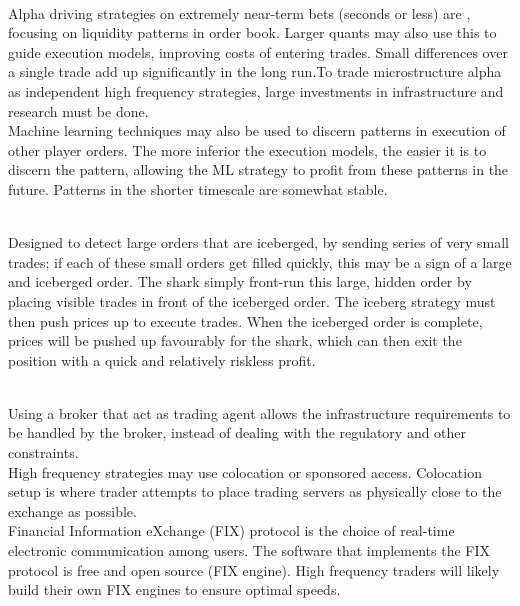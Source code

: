 \documentclass[a4paper,oneside,openany]{book}
\begin{document}
\begin{definition} \\
Alpha driving strategies on extremely near-term bets (seconds or less) are , focusing on liquidity patterns in order book. Larger quants may also use this to guide execution models, improving costs of entering trades. Small differences over a single trade add up significantly in the long run.To trade microstructure alpha as independent high frequency strategies, large investments in infrastructure and research must be done.\\
Machine learning techniques may also be used to discern patterns in execution of other player orders. The more inferior the execution models, the easier it is to discern the pattern, allowing the ML strategy to profit from these patterns in the future. Patterns in the shorter timescale are somewhat stable.
\end{definition}

\begin{definition} \\
Designed to detect large orders that are iceberged, by sending series of very small trades; if each of these small orders get filled quickly, this may be a sign of a large and iceberged order. The shark simply front-run this large, hidden order by placing visible trades in front of the iceberged order. The iceberg strategy must then push prices up to execute trades. When the iceberged order is complete, prices will be pushed up favourably for the shark, which can then exit the position with a quick and relatively riskless profit.
\end{definition}

\begin{remark} \\
Using a broker that act as trading agent allows the infrastructure requirements to be handled by the broker, instead of dealing with the regulatory and other constraints. \\
High frequency strategies may use colocation or sponsored access. Colocation setup is where trader attempts to place trading servers as physically close to the exchange as possible.\\
Financial Information eXchange (FIX) protocol is the choice of real-time electronic communication among users. The software that implements the FIX protocol is free and open source (FIX engine). High frequency traders will likely build their own FIX engines to ensure optimal speeds.
\end{remark}
\end{document}
